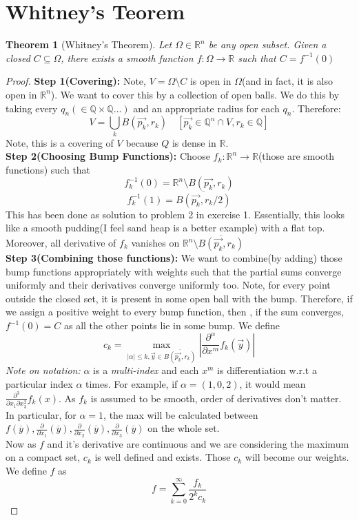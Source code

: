 \documentclass[oneside]{book}\twocolumn
\newtheorem{theorem}{Theorem}
\begin{document}
\section{Whitney's Teorem}
\begin{theorem}[Whitney's Theorem]
Let $\Omega\in\mathbb R^n$ be any open subset. Given a closed $C\subseteq \Omega$, there exists a smooth function $f:\Omega\to\mathbb R$ such that $C=f^{-1}(0)$
\end{theorem}
\begin{proof}
\textbf{Step 1(Covering): }Note, $V=\Omega\setminus C$ is open in $\Omega$(and in fact, it is also open in $\mathbb R^n$). We want to cover this by a collection of open balls. We do this by taking every $q_n(\in\mathbb Q\times\mathbb Q\hdots)$ and an appropriate radius for each $q_n$. Therefore:
$$V=\bigcup_{k} B(\overrightarrow{p_k},r_k)\quad[\overrightarrow{p_k}\in\mathbb Q^n\cap V,r_k\in\mathbb Q]$$
Note, this is a covering of $V$ because $Q$ is dense in $\mathbb R$.\\
\textbf{Step 2(Choosing Bump Functions): }Choose $f_k:\mathbb R^n\to \mathbb R$(those are smooth functions) such that $$f_k^{-1}(0)=\mathbb R^n\setminus B(\overrightarrow{p_k},r_k)$$
$$f_k^{-1}(1)=\overline{ B(\overrightarrow{p_k},r_k/2)}$$
This has been done as solution to problem 2 in exercise 1. Essentially, this looks like a smooth pudding(I feel sand heap is a better example) with a flat top. Moreover, all derivative of $f_k$ vanishes on $\mathbb R^n\setminus \overline{B(\overrightarrow{p_k},r_k)}$\\
\textbf{Step 3(Combining those functions): }We want to combine(by adding) those bump functions appropriately with weights such that the partial sums converge uniformly and their derivatives converge uniformly too. Note, for every point outside the closed set, it is present in some open ball with the bump. Therefore, if we assign a positive weight to every bump function, then , if the sum converges, $f^{-1}(0)=C$ as all the other points lie in some bump. We define 
$$c_k=\max_{|\alpha|\leq k,\overrightarrow{y}\in \overline{B(\overrightarrow{p_k},r_k)}}\left|\frac{\partial^\alpha}{\partial x^m}f_k(\overrightarrow{y})\right|$$
\textit{Note on notation:} $\alpha$ is a \textit{multi-index} and each $x^m$ is differentiation w.r.t a particular index $\alpha$ times. For example, if $\alpha=(1,0,2)$, it would mean $\frac{\partial^3}{\partial x_1\partial x_3^2}f_k(x)$. As $f_k$ is assumed to be smooth, order of derivatives don't matter. In particular, for $\alpha=1$, the max will be calculated between $f(\overline{y}),\frac{\partial}{\partial x_1}(\overline{y}),\frac{\partial}{\partial x_2}(\overline{y}),\frac{\partial}{\partial x_3}(\overline{y})$ on the whole set.\\
Now as $f$ and it's derivative are continuous and we are considering the maximum on a compact set, $c_k$ is well defined and exists. Those $c_k$ will become our weights. We define $f$ as
$$f=\sum_{k=0}^\infty \frac{f_k}{2^kc_k}$$


\end{proof}
\end{document}
